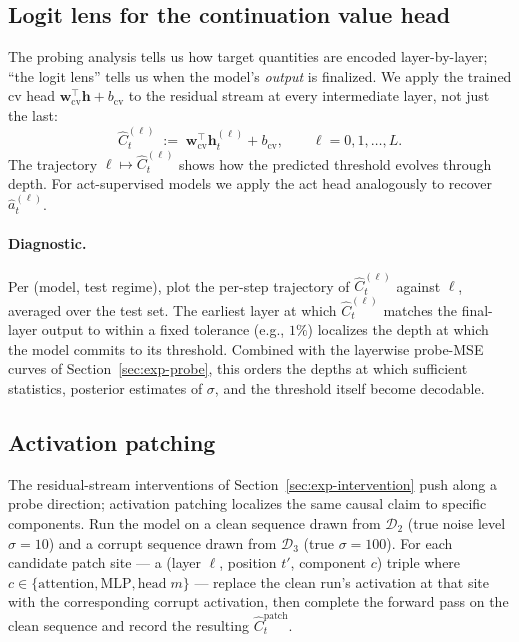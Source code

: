 \documentclass[11pt]{article}
\begin{document}
\subsection{Logit lens for the continuation value head}
\label{sec:exp-logit-lens}

The probing analysis tells us how target quantities are encoded layer-by-layer; ``the logit lens'' tells us when the model's \emph{output} is finalized. We apply the trained cv head $\mathbf{w}_{\mathrm{cv}}^\top \mathbf{h} + b_{\mathrm{cv}}$ to the residual stream at every intermediate layer, not just the last:
\[
\widehat C_t^{(\ell)} \;:=\; \mathbf{w}_{\mathrm{cv}}^\top \mathbf{h}_t^{(\ell)} + b_{\mathrm{cv}}, \qquad \ell = 0, 1, \ldots, L.
\]
The trajectory $\ell \mapsto \widehat C_t^{(\ell)}$ shows how the predicted threshold evolves through depth. For act-supervised models we apply the act head analogously to recover $\hat a_t^{(\ell)}$.

\paragraph{Diagnostic.} Per (model, test regime), plot the per-step trajectory of $\widehat C_t^{(\ell)}$ against $\ell$, averaged over the test set. The earliest layer at which $\widehat C_t^{(\ell)}$ matches the final-layer output to within a fixed tolerance (e.g., $1\%$) localizes the depth at which the model commits to its threshold. Combined with the layerwise probe-MSE curves of Section~\ref{sec:exp-probe}, this orders the depths at which sufficient statistics, posterior estimates of $\sigma$, and the threshold itself become decodable.

\subsection{Activation patching}
\label{sec:exp-patching}

The residual-stream interventions of Section~\ref{sec:exp-intervention} push along a probe direction; activation patching localizes the same causal claim to specific components. Run the model on a clean sequence drawn from $\mathcal{D}_2$ (true noise level $\sigma = 10$) and a corrupt sequence drawn from $\mathcal{D}_3$ (true $\sigma = 100$). For each candidate patch site --- a (layer $\ell$, position $t'$, component $c$) triple where $c \in \{\text{attention}, \text{MLP}, \text{head}\;m\}$ --- replace the clean run's activation at that site with the corresponding corrupt activation, then complete the forward pass on the clean sequence and record the resulting $\widehat C_t^{\mathrm{patch}}$.
\end{document}
